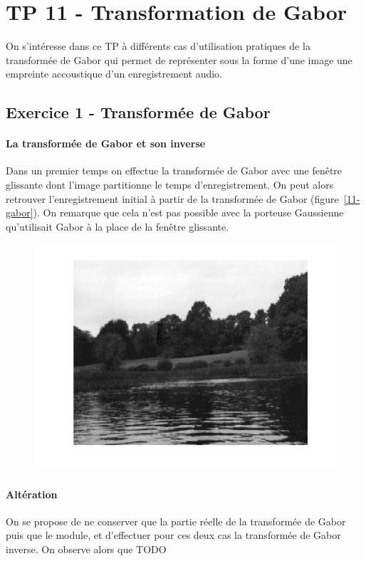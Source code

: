 \documentclass{article}
\begin{document}
\section{TP 11 - Transformation de Gabor}
On s'intéresse dans ce TP à différents cas d'utilisation pratiques de la transformée de Gabor qui permet de représenter sous la forme d'une image une empreinte accoustique d'un enregistrement audio.

\subsection{Exercice 1 - Transformée de Gabor}
\paragraph{La transformée de Gabor et son inverse}
Dans un premier temps on effectue la transformée de Gabor avec une fenêtre glissante dont l'image partitionne le temps d'enregistrement. On peut alors retrouver l'enregistrement initial à partir de la transformée de Gabor (figure~\ref{11-gabor}). On remarque que cela n'est pas possible avec la porteuse Gaussienne qu'utilisait Gabor à la place de la fenêtre glissante.

\begin{figure}[!ht]
\includegraphics[width=\textwidth]{images/1/1-1-autumn_b.png}
\end{figure}

\paragraph{Altération}
On se propose de ne conserver que la partie réelle de la transformée de Gabor puis que le module, et d'effectuer pour ces deux cas la transformée de Gabor inverse. On observe alors que TODO
\end{document}
